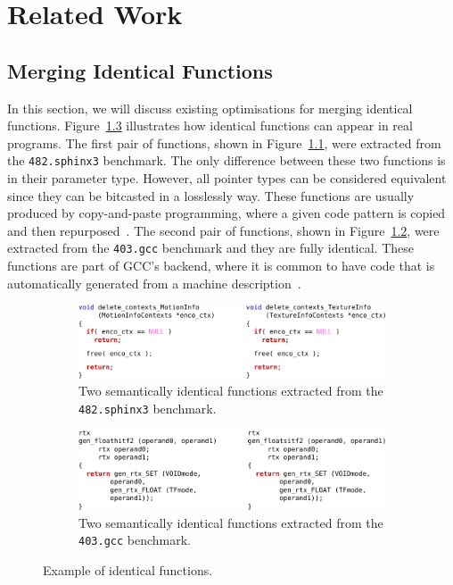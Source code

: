 \chapter{Related Work}


\section{Merging Identical Functions}

In this section, we will discuss existing optimisations for merging identical functions.
Figure~\ref{fig:example-identical} illustrates how identical functions can appear in real programs.
The first pair of functions, shown in Figure~\ref{fig:example-identical-1-sphinx3}, were extracted from the \texttt{482.sphinx3} benchmark.
The only difference between these two functions is in their parameter type.
However, all pointer types can be considered equivalent since they can be bitcasted in a losslessly way.
These functions are usually produced by copy-and-paste programming, where a given code pattern is copied and then repurposed~\cite{kim04,jablonski10,ahmed15}.
The second pair of functions, shown in Figure~\ref{fig:example-identical-2-gcc}, were extracted from the \texttt{403.gcc} benchmark and they are fully identical.
These functions are part of GCC's backend, where it is common to have code that is automatically generated from a machine description~\cite{muchnick98,kolek13,ghica15}.

\begin{figure}[h]
\centering
\begin{subfigure}{\textwidth}
\centering
\includegraphics[scale=0.9]{src/relatedwork/figs/example-identical-1-sphinx3}
\caption{Two semantically identical functions extracted from the \texttt{482.sphinx3} benchmark.}
\label{fig:example-identical-1-sphinx3}
\end{subfigure}
\begin{subfigure}{\textwidth}
\centering
\includegraphics[scale=0.9]{src/relatedwork/figs/example-identical-2-gcc}
\caption{Two semantically identical functions extracted from the \texttt{403.gcc} benchmark.}
\label{fig:example-identical-2-gcc}
\end{subfigure}
\caption{Example of identical functions.}
\label{fig:example-identical}
\end{figure}

